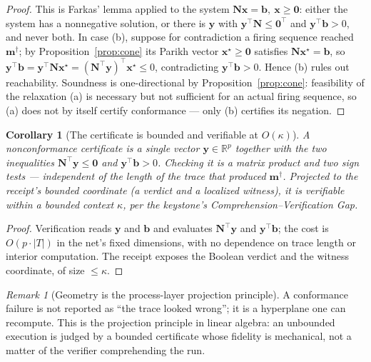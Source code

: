 \documentclass[11pt,oneside]{book}
\theoremstyle{definition}
\theoremstyle{plain}
\newtheorem{corollary}[theorem]{Corollary}
\theoremstyle{remark}
\newtheorem*{remark}{Remark}
\newcommand{\CL}{\kappa}                       %
\newcommand{\Nmat}{\mathbf{N}}                 %
\begin{document}
\begin{proof}
This is Farkas' lemma \cite{schrijver1986} applied to the system $\Nmat\bm x=\bm b,\ \bm
x\ge\bm 0$: either the system has a nonnegative solution, or there is $\bm y$ with
$\bm y^{\!\top}\Nmat\le\bm 0^{\!\top}$ and $\bm y^{\!\top}\bm b>0$, and never both. In case (b),
suppose for contradiction a firing sequence reached $\bm m^{\dagger}$; by
Proposition~\ref{prop:cone} its Parikh vector $\bm x^{\star}\ge\bm 0$ satisfies
$\Nmat\bm x^{\star}=\bm b$, so $\bm y^{\!\top}\bm b=\bm y^{\!\top}\Nmat\bm x^{\star}
=(\Nmat^{\!\top}\bm y)^{\!\top}\bm x^{\star}\le 0$, contradicting $\bm y^{\!\top}\bm b>0$.
Hence (b) rules out reachability. Soundness is one-directional by
Proposition~\ref{prop:cone}: feasibility of the relaxation (a) is necessary but not
sufficient for an actual firing sequence, so (a) does not by itself certify conformance ---
only (b) certifies its negation. \end{proof}

\begin{corollary}[The certificate is bounded and verifiable at $O(\CL)$]\label{cor:cert}
A nonconformance certificate is a single vector $\bm y\in\mathbb{R}^{p}$ together with the two
inequalities $\Nmat^{\!\top}\bm y\le\bm 0$ and $\bm y^{\!\top}\bm b>0$. Checking it is a matrix
product and two sign tests --- independent of the length of the trace that produced $\bm
m^{\dagger}$. Projected to the receipt's bounded coordinate (a verdict and a localized
witness), it is verifiable within a bounded context $\CL$, per the keystone's
Comprehension--Verification Gap.
\end{corollary}

\begin{proof}
Verification reads $\bm y$ and $\bm b$ and evaluates $\Nmat^{\!\top}\bm y$ and $\bm
y^{\!\top}\bm b$; the cost is $O(p\cdot|T|)$ in the net's fixed dimensions, with no dependence
on trace length or interior computation. The receipt exposes the Boolean verdict and the
witness coordinate, of size $\le\CL$. \end{proof}

\begin{remark}[Geometry is the process-layer projection principle]
A conformance failure is not reported as ``the trace looked wrong''; it is a hyperplane one can
recompute. This is the projection principle in linear algebra: an unbounded execution is
judged by a bounded certificate whose fidelity is mechanical, not a matter of the verifier
comprehending the run.
\end{remark}
\end{document}
